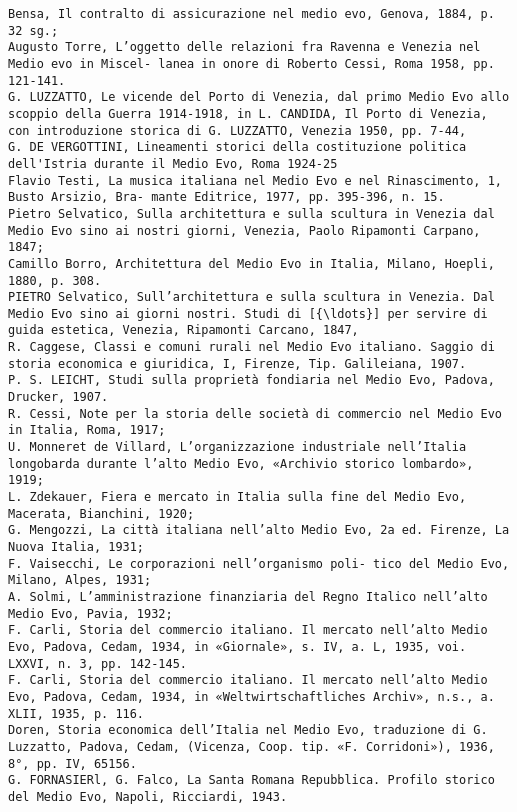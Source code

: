 \documentclass[11pt]{article}
\begin{document}
    \begin{Verbatim}[commandchars=\\\{\}]
Bensa, Il contralto di assicurazione nel medio evo, Genova, 1884, p. 32 sg.;
Augusto Torre, L’oggetto delle relazioni fra Ravenna e Venezia nel Medio evo in Miscel- lanea in onore di Roberto Cessi, Roma 1958, pp. 121-141.
G. LUZZATTO, Le vicende del Porto di Venezia, dal primo Medio Evo allo scoppio della Guerra 1914-1918, in L. CANDIDA, Il Porto di Venezia, con introduzione storica di G. LUZZATTO, Venezia 1950, pp. 7-44,
G. DE VERGOTTINI, Lineamenti storici della costituzione politica dell'Istria durante il Medio Evo, Roma 1924-25
Flavio Testi, La musica italiana nel Medio Evo e nel Rinascimento, 1, Busto Arsizio, Bra- mante Editrice, 1977, pp. 395-396, n. 15.
Pietro Selvatico, Sulla architettura e sulla scultura in Venezia dal Medio Evo sino ai nostri giorni, Venezia, Paolo Ripamonti Carpano, 1847;
Camillo Borro, Architettura del Medio Evo in Italia, Milano, Hoepli, 1880, p. 308.
PIETRO Selvatico, Sull’architettura e sulla scultura in Venezia. Dal Medio Evo sino ai giorni nostri. Studi di [{\ldots}] per servire di guida estetica, Venezia, Ripamonti Carcano, 1847,
R. Caggese, Classi e comuni rurali nel Medio Evo italiano. Saggio di storia economica e giuridica, I, Firenze, Tip. Galileiana, 1907.
P. S. LEICHT, Studi sulla proprietà fondiaria nel Medio Evo, Padova, Drucker, 1907.
R. Cessi, Note per la storia delle società di commercio nel Medio Evo in Italia, Roma, 1917;
U. Monneret de Villard, L’organizzazione industriale nell’Italia longobarda durante l’alto Medio Evo, «Archivio storico lombardo», 1919;
L. Zdekauer, Fiera e mercato in Italia sulla fine del Medio Evo, Macerata, Bianchini, 1920;
G. Mengozzi, La città italiana nell’alto Medio Evo, 2a ed. Firenze, La Nuova Italia, 1931;
F. Vaisecchi, Le corporazioni nell’organismo poli- tico del Medio Evo, Milano, Alpes, 1931;
A. Solmi, L’amministrazione finanziaria del Regno Italico nell’alto Medio Evo, Pavia, 1932;
F. Carli, Storia del commercio italiano. Il mercato nell’alto Medio Evo, Padova, Cedam, 1934, in «Giornale», s. IV, a. L, 1935, voi. LXXVI, n. 3, pp. 142-145.
F. Carli, Storia del commercio italiano. Il mercato nell’alto Medio Evo, Padova, Cedam, 1934, in «Weltwirtschaftliches Archiv», n.s., a. XLII, 1935, p. 116.
Doren, Storia economica dell’Italia nel Medio Evo, traduzione di G. Luzzatto, Padova, Cedam, (Vicenza, Coop. tip. «F. Corridoni»), 1936, 8°, pp. IV, 65156.
G. FORNASIERl, G. Falco, La Santa Romana Repubblica. Profilo storico del Medio Evo, Napoli, Ricciardi, 1943.

    \end{Verbatim}
\end{document}
